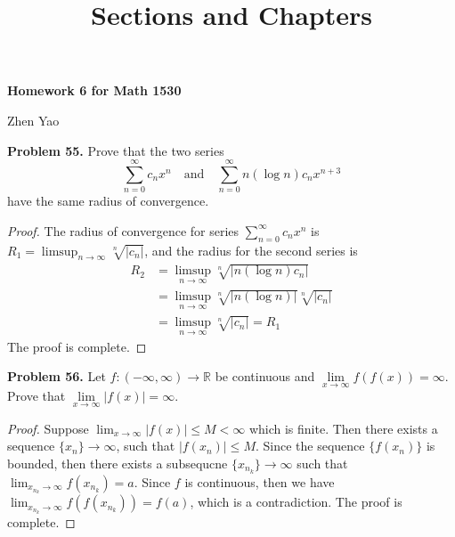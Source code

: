 \documentclass[12pt,leqno]{amsart}
\title{Sections and Chapters}
\theoremstyle{definition}
\begin{document}
\centerline{\bf Homework 6 for Math 1530}
\centerline{Zhen Yao}



\bigskip


\noindent
{\bf Problem 55.}
Prove that the two series
$$
\sum_{n=0}^\infty c_n x^n
\quad
\text{and}
\quad
\sum_{n=0}^\infty n(\log n)c_n x^{n+3}
$$
have the same radius of convergence.
\begin{proof}
The radius of convergence for series $\sum_{n=0}^\infty c_n x^n$ is $R_1 = \limsup_{n\to\infty}\sqrt[n]{|c_n|}$, and the radius for the second series is 
\begin{align*}
    R_2 &= \limsup_{n\to\infty}\sqrt[n]{|n(\log n)c_n|}\\
    &= \limsup_{n\to\infty}\sqrt[n]{|n(\log n)|} \sqrt[n]{|c_n|} \\
    &= \limsup_{n\to\infty}\sqrt[n]{|c_n|} = R_1
\end{align*}
The proof is complete.
\end{proof}

\medskip


\noindent
{\bf Problem 56.}
Let $f:(-\infty,\infty)\rightarrow\mathbb R$ be continuous and $\lim\limits_{x\rightarrow\infty}f(f(x))=\infty$.
Prove that $\displaystyle \lim\limits_{x\rightarrow\infty}|f(x)|=\infty$.
\begin{proof}
Suppose $\lim_{x\to\infty}|f(x)| \leq M <\infty$ which is finite. Then there exists a sequence $\{x_n\}\to\infty$, such that $|f(x_n)|\leq M$. Since the sequence $\{f(x_n)\}$ is bounded, then there exists a subsequcne $\{x_{n_k}\}\to\infty$ such that $\lim_{x_{n_k}\to\infty}f(x_{n_k}) = a$. Since $f$ is continuous, then we have $\lim_{x_{n_k}\to\infty}f(f(x_{n_k})) = f(a)$, which is a contradiction. The proof is complete.
\end{proof}

\medskip
\end{document}
